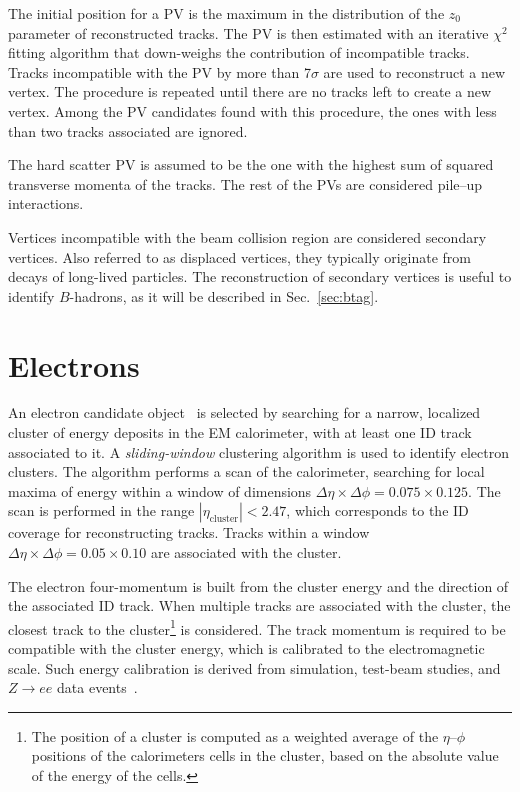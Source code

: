 The initial position for a PV is the maximum in the distribution of
the $z_0$ parameter of reconstructed tracks. The PV is then
estimated with an iterative $\chi^2$ fitting algorithm that
down-weighs the contribution of incompatible tracks. Tracks
incompatible with the PV by more than 7$\sigma$ are used to
reconstruct a new vertex. The procedure is repeated until there are no
tracks left to create a new vertex. Among the PV candidates found with
this procedure, the ones with less than two tracks associated are ignored. 

The hard scatter PV is assumed to be the one with the highest sum of
squared transverse momenta of the tracks. The rest of the PVs are
considered pile--up interactions. 

Vertices incompatible with the beam collision region are considered
secondary vertices.
Also referred to as displaced vertices, they typically originate from
decays of long-lived particles.
The reconstruction of secondary vertices is useful to identify
$B$-hadrons, as it will be described in Sec.~\ref{sec:btag}.

\section{Electrons}
\label{sec:electrons}

An electron candidate object~\cite{elereco} is selected by searching 
for a narrow, 
localized cluster of energy deposits in the EM calorimeter, 
with at least one ID track associated to it.
A {\it sliding-window} clustering algorithm is used to identify electron 
clusters. The algorithm performs a scan of the calorimeter, searching 
for local maxima of energy within a window of dimensions
$\Delta\eta\times\Delta\phi=0.075\times{}0.125$. 
The scan is performed in the range $|\eta_{\mathrm{cluster}}|<2.47$, 
which corresponds to the ID coverage for reconstructing tracks. 
Tracks within a window $\Delta\eta\times\Delta\phi=0.05\times{}0.10$
are associated with the cluster.

The electron four-momentum is built from the cluster energy
and the direction of the associated ID track.
When multiple tracks are associated with the cluster, the closest track
to the cluster\footnote{The position of a cluster 
is computed as a weighted average of the $\eta$--$\phi$ positions 
of the calorimeters cells in the cluster, based on the absolute 
value of the energy of the cells.} is considered.
The track momentum is required to be compatible with the cluster energy,
which is calibrated to the electromagnetic scale. Such energy calibration is
derived from simulation, test-beam studies, and $Z\to ee$ data 
events~\cite{elecalib}.

